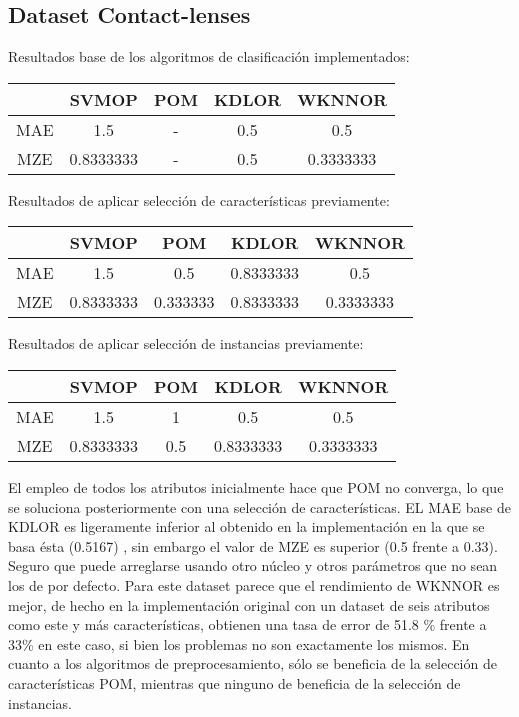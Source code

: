 \subsection{Dataset Contact-lenses}
Resultados base de los algoritmos de clasificación implementados:
\begin{center}
\begin{tabular}{ c c c c c }
	& SVMOP & POM & KDLOR & WKNNOR \\
	\hline	
	MAE &	1.5 & - & 0.5  & 0.5 \\
	MZE &	0.8333333 & - & 0.5 & 0.3333333  \\
	\hline  
\end{tabular}
\end{center}
\vspace{20pt}
Resultados de aplicar selección de características previamente:
\begin{center}
\begin{tabular}{ c c c c c }
	& SVMOP & POM & KDLOR & WKNNOR  \\
	\hline	
	MAE &      	1.5 & 0.5 & 0.8333333  & 0.5 \\
	MZE &	0.8333333 & 0.333333 & 0.8333333 & 0.3333333  \\
	\hline  
\end{tabular}
\end{center}
\vspace{20pt}
Resultados de aplicar selección de instancias previamente:
\begin{center}
\begin{tabular}{ c c c c c }
	& SVMOP & POM & KDLOR & WKNNOR  \\
	\hline	
	MAE &      	1.5 & 1 & 0.5  & 0.5 \\
	MZE &	0.8333333 & 0.5 & 0.8333333 & 0.3333333  \\
	\hline  
\end{tabular}
\end{center}

El empleo de todos los atributos inicialmente hace que POM no converga, lo que se soluciona posteriormente con una selección de características. EL MAE base de KDLOR es ligeramente inferior al obtenido en la implementación en la que se basa ésta (0.5167) \cite{Gutiérrez2016},  sin embargo el valor de MZE es superior (0.5 frente a 0.33). Seguro que puede arreglarse usando otro núcleo y otros parámetros que no sean los de por defecto. Para este dataset parece que el rendimiento de WKNNOR es mejor, de hecho en la implementación original \cite{duivesteijn2008nearest} con un dataset de seis atributos como este y más características, obtienen una tasa de error de 51.8 \% frente a 33\% en este caso, si bien los problemas no son exactamente los mismos. En cuanto a los algoritmos de preprocesamiento, sólo se beneficia de la selección de características POM, mientras que ninguno de beneficia de la selección de instancias.

